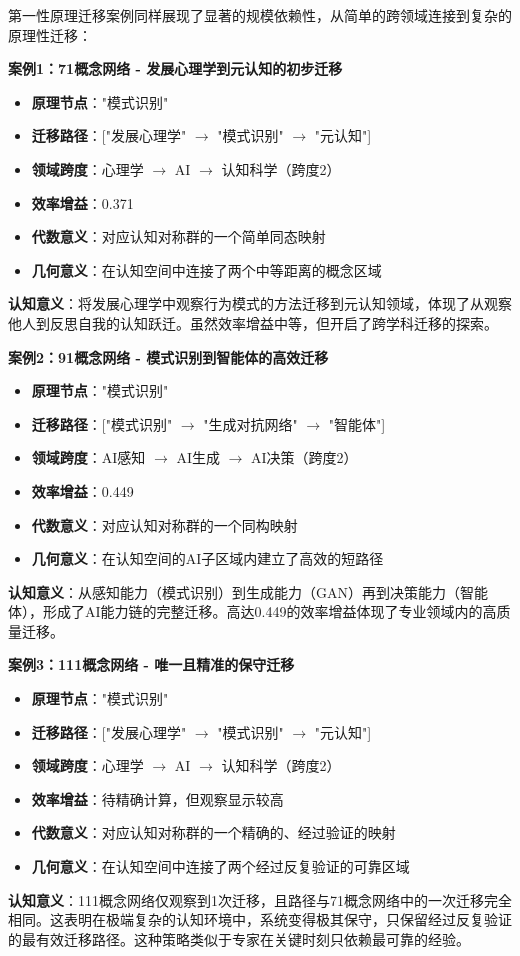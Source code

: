\documentclass[12pt,a4paper]{article}
\begin{document}
第一性原理迁移案例同样展现了显著的规模依赖性，从简单的跨领域连接到复杂的原理性迁移：

\textbf{案例1：71概念网络 - 发展心理学到元认知的初步迁移}
\begin{itemize}
\item \textbf{原理节点}："模式识别"
\item \textbf{迁移路径}：["发展心理学" $\rightarrow$ "模式识别" $\rightarrow$ "元认知"]
\item \textbf{领域跨度}：心理学 $\rightarrow$ AI $\rightarrow$ 认知科学（跨度2）
\item \textbf{效率增益}：0.371
\item \textbf{代数意义}：对应认知对称群的一个简单同态映射
\item \textbf{几何意义}：在认知空间中连接了两个中等距离的概念区域
\end{itemize}
\textbf{认知意义}：将发展心理学中观察行为模式的方法迁移到元认知领域，体现了从观察他人到反思自我的认知跃迁。虽然效率增益中等，但开启了跨学科迁移的探索。

\textbf{案例2：91概念网络 - 模式识别到智能体的高效迁移}
\begin{itemize}
\item \textbf{原理节点}："模式识别"
\item \textbf{迁移路径}：["模式识别" $\rightarrow$ "生成对抗网络" $\rightarrow$ "智能体"]
\item \textbf{领域跨度}：AI感知 $\rightarrow$ AI生成 $\rightarrow$ AI决策（跨度2）
\item \textbf{效率增益}：0.449
\item \textbf{代数意义}：对应认知对称群的一个同构映射
\item \textbf{几何意义}：在认知空间的AI子区域内建立了高效的短路径
\end{itemize}
\textbf{认知意义}：从感知能力（模式识别）到生成能力（GAN）再到决策能力（智能体），形成了AI能力链的完整迁移。高达0.449的效率增益体现了专业领域内的高质量迁移。

\textbf{案例3：111概念网络 - 唯一且精准的保守迁移}
\begin{itemize}
\item \textbf{原理节点}："模式识别"
\item \textbf{迁移路径}：["发展心理学" $\rightarrow$ "模式识别" $\rightarrow$ "元认知"]
\item \textbf{领域跨度}：心理学 $\rightarrow$ AI $\rightarrow$ 认知科学（跨度2）
\item \textbf{效率增益}：待精确计算，但观察显示较高
\item \textbf{代数意义}：对应认知对称群的一个精确的、经过验证的映射
\item \textbf{几何意义}：在认知空间中连接了两个经过反复验证的可靠区域
\end{itemize}
\textbf{认知意义}：111概念网络仅观察到1次迁移，且路径与71概念网络中的一次迁移完全相同。这表明在极端复杂的认知环境中，系统变得极其保守，只保留经过反复验证的最有效迁移路径。这种策略类似于专家在关键时刻只依赖最可靠的经验。
\end{document}
